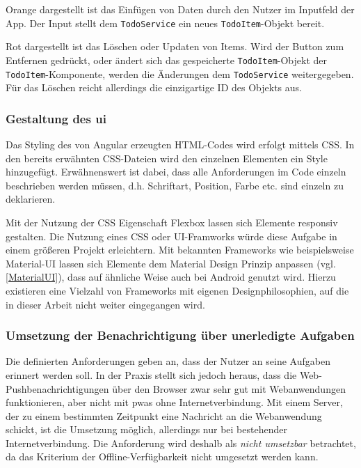Orange dargestellt ist das Einfügen von Daten durch den Nutzer im Inputfeld der App. Der Input stellt dem \texttt{TodoService} ein neues \texttt{TodoItem}-Objekt bereit.

Rot dargestellt ist das Löschen oder Updaten von Items. Wird der Button zum Entfernen gedrückt, oder ändert sich das gespeicherte \texttt{TodoItem}-Objekt der \texttt{TodoItem}-Komponente, werden die Änderungen dem \texttt{TodoService} weitergegeben.
Für das Löschen reicht allerdings die einzigartige ID des Objekts aus.

\subsubsection{Gestaltung des \acl{ui}}
Das Styling des von Angular erzeugten HTML-Codes wird erfolgt mittels CSS. In den bereits erwähnten CSS-Dateien wird den einzelnen Elementen ein Style hinzugefügt.
Erwähnenswert ist dabei, dass alle Anforderungen im Code einzeln beschrieben werden müssen, d.h. Schriftart, Position, Farbe etc. sind einzeln zu deklarieren.

Mit der Nutzung der CSS Eigenschaft Flexbox lassen sich Elemente responsiv gestalten. Die Nutzung eines CSS oder UI-Framworks würde diese Aufgabe in einem größeren Projekt erleichtern. Mit bekannten Frameworks wie beispielsweise Material-UI lassen sich Elemente dem Material Design Prinzip anpassen (vgl. \ref{MaterialUI}), dass auf ähnliche Weise auch bei Android genutzt wird. Hierzu existieren eine Vielzahl von Frameworks mit eigenen Designphilosophien, auf die in dieser Arbeit nicht weiter eingegangen wird.

\subsubsection{Umsetzung der Benachrichtigung über unerledigte Aufgaben}
Die definierten Anforderungen geben an, dass der Nutzer an seine Aufgaben erinnert werden soll. In der Praxis stellt sich jedoch heraus, dass die Web-Pushbenachrichtigungen über den Browser zwar sehr gut mit Webanwendungen funktionieren, aber nicht mit \ac{pwa}s ohne Internetverbindung. Mit einem Server, der zu einem bestimmten Zeitpunkt eine Nachricht an die Webanwendung schickt, ist die Umsetzung möglich, allerdings nur bei bestehender Internetverbindung. Die Anforderung wird deshalb als \textit{nicht umsetzbar} betrachtet, da das Kriterium der Offline-Verfügbarkeit nicht umgesetzt werden kann.



